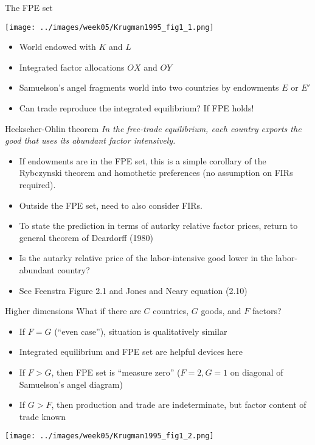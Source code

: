 \documentclass[11pt,notes=hide,aspectratio=169]{beamer}
\begin{document}
\begin{frame}{The FPE set}
\vspace{-3mm}
\begin{center}\texttt{[image: ../images/week05/Krugman1995\_fig1\_1.png]}\end{center}
\vspace{-3mm}
\begin{itemize}
	\item World endowed with $K$ and $L$
	\item Integrated factor allocations $OX$ and $OY$
	\item Samuelson's angel fragments world into two countries by endowments $E$ or $E'$
	\item Can trade reproduce the integrated equilibrium?
	If FPE holds!
\end{itemize}
\end{frame}
\begin{frame}{Heckscher-Ohlin theorem}
\textit{In the free-trade equilibrium, each country exports the good that uses its abundant factor intensively.}
\begin{itemize}
	\item If endowments are in the FPE set, this is a simple corollary of the Rybczynski theorem and homothetic preferences (no assumption on FIRs required).
	\item Outside the FPE set, need to also consider FIRs.
	\item To state the prediction in terms of autarky relative factor prices, return to general theorem of Deardorff (1980)
	\item Is the autarky relative price of the labor-intensive good lower in the labor-abundant country?
	\item See Feenstra Figure 2.1 and Jones and Neary equation (2.10)
\end{itemize}
\end{frame}
\begin{frame}{Higher dimensions}
What if there are $C$ countries, $G$ goods, and $F$ factors?
\begin{itemize}
	\item If $F=G$ (``even case''), situation is qualitatively similar
	\item Integrated equilibrium and FPE set are helpful devices here
	\item If $F>G$, then FPE set is ``measure zero'' ($F=2,G=1$ on diagonal of Samuelson's angel diagram)
	\item If $G>F$, then production and trade are indeterminate, but factor content of trade known
\end{itemize}
\begin{center}\texttt{[image: ../images/week05/Krugman1995\_fig1\_2.png]}\end{center}
\end{frame}
\end{document}

